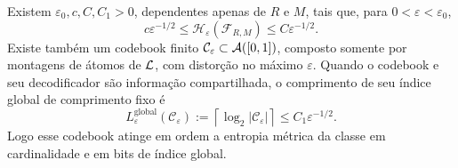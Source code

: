 \begin{theorem}\label{map:artigo_2:3.18}\label{artigo_2:thm:entropy}
Existem $\varepsilon_0,c,C,C_1>0$, dependentes apenas de $R$ e $M$, tais que, para $0<\varepsilon<\varepsilon_0$,
\begin{equation}
 c\varepsilon^{-1/2}
 \le\mathcal{H}_\varepsilon(\mathcal{F}_{R,M})
 \le C\varepsilon^{-1/2}.
 \label{artigo_2:eq:entropy-order}
\end{equation}
Existe também um codebook finito $\mathcal{C}_\varepsilon\subset\mathcal{A}([0,1])$, composto somente por montagens de átomos de $\mathcal{L}$, com distorção no máximo $\varepsilon$. Quando o codebook e seu decodificador são informação compartilhada, o comprimento de seu índice global de comprimento fixo é
\begin{equation}
 L_\varepsilon^{\mathrm{global}}(\mathcal C_\varepsilon)
 :=\left\lceil\log_2|\mathcal{C}_\varepsilon|\right\rceil
 \le C_1\varepsilon^{-1/2}.
 \label{artigo_2:eq:code-length}
\end{equation}
Logo esse codebook atinge em ordem a entropia métrica da classe em cardinalidade e em bits de índice global.
\end{theorem}

